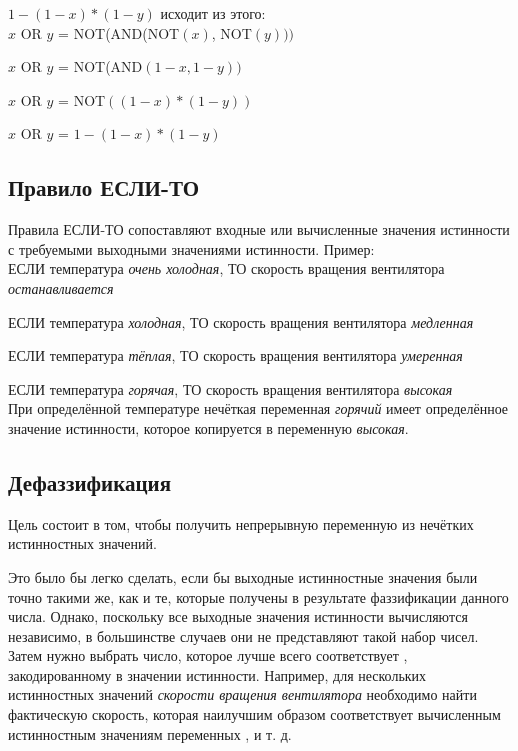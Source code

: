 \documentclass[a4paper,12pt]{report}
\begin{document}
\(1-(1-x)*(1-y)\) исходит из этого:\\

\(x\) OR \(y\) = NOT(AND(NOT\((x)\), NOT\((y)))\)

\(x\) OR \(y\) = NOT(AND\((1-x, 1-y) )\)

\(x\) OR \(y\) = NOT\(( (1-x)*(1-y) )\)

\(x\) OR \(y\) = \(1-(1-x)*(1-y)\)

\subsection{Правило ЕСЛИ-ТО}
Правила ЕСЛИ-ТО сопоставляют входные или вычисленные значения истинности с требуемыми выходными значениями истинности. Пример:\\

ЕСЛИ температура \textit{очень холодная}, ТО скорость вращения вентилятора \textit{останавливается}

ЕСЛИ температура \textit{холодная}, ТО скорость вращения вентилятора \textit{медленная}

ЕСЛИ температура \textit{тёплая}, ТО скорость вращения вентилятора \textit{умеренная}

ЕСЛИ температура \textit{горячая}, ТО скорость вращения вентилятора \textit{высокая}\\

При определённой температуре нечёткая переменная \textit{горячий} имеет определённое значение истинности, которое копируется в переменную \textit{высокая}.

\subsection{Дефаззификация}
Цель состоит в том, чтобы получить непрерывную переменную из нечётких истинностных значений.

Это было бы легко сделать, если бы выходные истинностные значения были точно такими же, как и те, которые получены в результате фаззификации данного числа. Однако, поскольку все выходные значения истинности вычисляются независимо, в большинстве случаев они не представляют такой набор чисел. Затем нужно выбрать число, которое лучше всего соответствует , закодированному в значении истинности. Например, для нескольких истинностных значений \textit{скорости вращения вентилятора} необходимо найти фактическую скорость, которая наилучшим образом соответствует вычисленным истинностным значениям переменных ,  и т. д.
\end{document}

